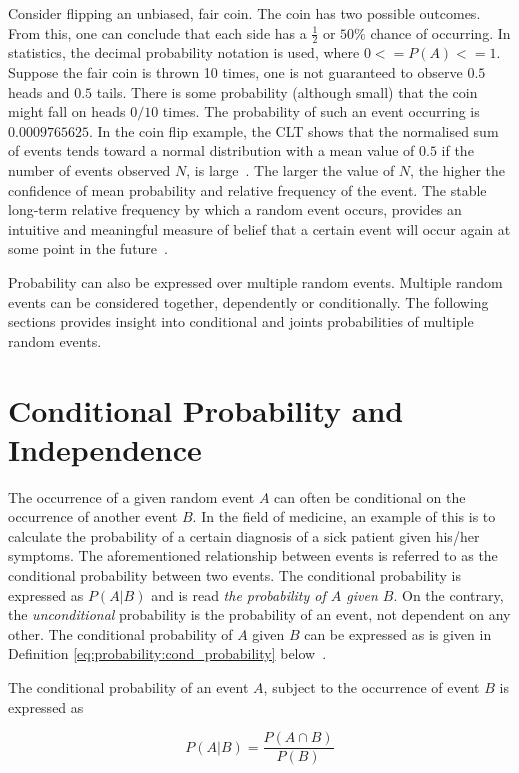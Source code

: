 Consider flipping an unbiased, fair coin. The coin has two possible outcomes. From this, one can conclude that each side has a $\frac{1}{2}$ or $50\%$ chance of occurring. In statistics, the decimal probability notation is used, where $0 <= P(A) <= 1$. Suppose the fair coin is thrown 10 times, one is not guaranteed to observe $0.5$ heads and $0.5$ tails. There is some probability (although small) that the coin might fall on heads $0/10$ times. The probability of such an event occurring is $0.0009765625$. In the coin flip example, the \acf{CLT} shows that the normalised sum of events tends toward a normal distribution with a mean value of $0.5$ if the number of events observed $N$, is large~\cite{ref:wackerly:2014}. The larger the value of $N$, the higher the confidence of mean probability and relative frequency of the event. The stable long-term relative frequency by which a random event occurs, provides an intuitive and meaningful measure of belief that a certain event will occur again at some point in the future~\cite{ref:wackerly:2014}.

Probability can also be expressed over multiple random events. Multiple random events can be considered together, dependently or conditionally. The following sections provides insight into conditional and joints probabilities of multiple random events.

\section{Conditional Probability and Independence}\label{sec:probability:cond_probability}

The occurrence of a given random event $A$ can often be conditional on the occurrence of another event $B$. In the field of medicine, an example of this is to calculate the probability of a certain diagnosis of a sick patient given his/her symptoms. The aforementioned relationship between events is referred to as the conditional probability between two events. The conditional probability is expressed as $P(A \vert B)$ and is read \textit{the probability of $A$ given $B$}. On the contrary, the \textit{unconditional} probability is the probability of an event, not dependent on any other. The conditional probability of $A$ given $B$ can be expressed as is given in Definition \ref{eq:probability:cond_probability} below~\cite{ref:wackerly:2014}.

\begin{definition}
      \label{eq:probability:cond_probability}
      The conditional probability of an event $A$, subject to the occurrence of event $B$ is expressed as

      \begin{equation}
            \label{eq:probability:overview:conditional}
            P(A \vert B) = \frac{P(A \cap B)}{P(B)}
      \end{equation}
\end{definition}

